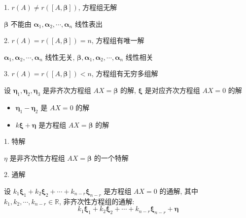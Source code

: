 \begin{theorem}

	1. $r(A)\neq r([A,\boldsymbol{\beta}])$, 方程组无解
	
	$\boldsymbol{\beta}$ 不能由 $\boldsymbol{\alpha}_{1},\boldsymbol{\alpha}_{2},\cdots,\boldsymbol{\alpha}_{n}$ 线性表出
	
	2. $r(A) = r([A,\boldsymbol{\beta}]) = n$, 方程组有唯一解

	$\boldsymbol{\alpha}_{1},\boldsymbol{\alpha}_{2},\cdots,\boldsymbol{\alpha}_{n}$ 线性无关,
	$\boldsymbol{\beta},\boldsymbol{\alpha}_{1},\boldsymbol{\alpha}_{2},\cdots,\boldsymbol{\alpha}_{n}$ 线性相关
	
	3. $r(A) = r([A,\boldsymbol{\beta}]) < n$, 方程组有无穷多组解
\end{theorem}

\begin{corollary}[解的性质]
	设 $\boldsymbol{\eta}_{1}, \boldsymbol{\eta}_{2}, \boldsymbol{\eta}_{3}$ 是非齐次方程组 $AX = \boldsymbol{\beta}$ 的解, $\boldsymbol{\xi}$ 是对应齐次方程组 $AX=0$ 的解

	\begin{itemize}
		\item $\boldsymbol{\eta}_{1} - \boldsymbol{\eta}_{2}$ 是 $AX=0$ 的解
		\item $k \boldsymbol{\xi} + \boldsymbol{\eta}$ 是方程组 $AX = \boldsymbol{\beta}$ 的解
	\end{itemize}
\end{corollary}

\begin{definition}[特解和通解]
	
	1. 特解
	
	$\eta$ 是非齐次性方程组 $AX = \boldsymbol{\beta}$ 的一个特解
	
	2. 通解
	
	设 $k_{1}\boldsymbol{\xi}_{1} + k_{2}\boldsymbol{\xi}_{2} + \cdots + k_{n-r}\boldsymbol{\xi}_{n-r}$ 是方程组 $AX=0$ 的通解, 
	其中 $k_{1},k_{2},\cdots,k_{n-r}\in \mathbb{R}$, 非齐次性方程组的通解:  
	$$k_{1}\boldsymbol{\xi}_{1} + k_{2}\boldsymbol{\xi}_{2} + \cdots + k_{n-r}\boldsymbol{\xi}_{n-r} + \boldsymbol{\eta}$$
\end{definition}


